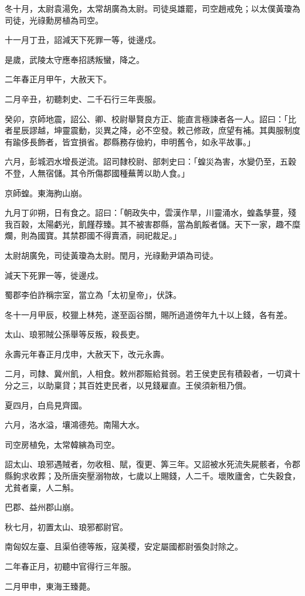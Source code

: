 \begin{pinyinscope}
冬十月，太尉袁湯免，太常胡廣為太尉。司徒吳雄罷，司空趙戒免；以太僕黃瓊為司徒，光祿勳房植為司空。

十一月丁丑，詔減天下死罪一等，徙邊戍。

是歲，武陵太守應奉招誘叛蠻，降之。

二年春正月甲午，大赦天下。

二月辛丑，初聽刺史、二千石行三年喪服。

癸卯，京師地震，詔公、卿、校尉舉賢良方正、能直言極諫者各一人。詔曰：「比者星辰謬越，坤靈震動，災異之降，必不空發。敕己修政，庶望有補。其輿服制度有踰侈長飾者，皆宜損省。郡縣務存儉約，申明舊令，如永平故事。」

六月，彭城泗水增長逆流。詔司隸校尉、部刺史曰：「蝗災為害，水變仍至，五穀不登，人無宿儲。其令所傷郡國種蕪菁以助人食。」

京師蝗。東海朐山崩。

九月丁卯朔，日有食之。詔曰：「朝政失中，雲漢作旱，川靈涌水，蝗螽孳蔓，殘我百穀，太陽虧光，飢饉荐臻。其不被害郡縣，當為飢餒者儲。天下一家，趣不糜爛，則為國寶。其禁郡國不得賣酒，祠祀裁足。」

太尉胡廣免，司徒黃瓊為太尉。閏月，光祿勳尹頌為司徒。

減天下死罪一等，徙邊戍。

蜀郡李伯詐稱宗室，當立為「太初皇帝」，伏誅。

冬十一月甲辰，校獵上林苑，遂至函谷關，賜所過道傍年九十以上錢，各有差。

太山、琅邪賊公孫舉等反叛，殺長吏。

永壽元年春正月戊申，大赦天下，改元永壽。

二月，司隸、冀州飢，人相食。敕州郡賑給貧弱。若王侯吏民有積穀者，一切貣十分之三，以助稟貸；其百姓吏民者，以見錢雇直。王侯須新租乃償。

夏四月，白烏見齊國。

六月，洛水溢，壤鴻德苑。南陽大水。

司空房植免，太常韓縯為司空。

詔太山、琅邪遇賊者，勿收租、賦，復更、筭三年。又詔被水死流失屍骸者，令郡縣鉤求收葬；及所唐突壓溺物故，七歲以上賜錢，人二千。壞敗廬舍，亡失穀食，尤貧者稟，人二斛。

巴郡、益州郡山崩。

秋七月，初置太山、琅邪都尉官。

南匈奴左臺、且渠伯德等叛，寇美稷，安定屬國都尉張奐討除之。

二年春正月，初聽中官得行三年服。

二月甲申，東海王臻薨。


\end{pinyinscope}
